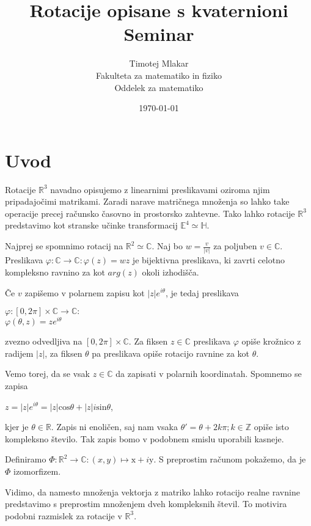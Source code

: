 \documentclass[a4paper,12pt]{article}
\title{Rotacije opisane s kvaternioni \\ 
\Large Seminar}
\author{Timotej Mlakar \\
Fakulteta za matematiko in fiziko \\
Oddelek za matematiko}
\date{\today}
\def\Z{\mathbb{Z}} %
\def\R{\mathbb{R}} %
\def\C{\mathbb{C}} %
\def\H{\mathbb{H}} %
\def\E{\mathbb{E}} %
\begin{document}


\maketitle



\section{Uvod}

Rotacije $\R^3$ navadno opisujemo z linearnimi preslikavami oziroma njim pripadajočimi matrikami.
Zaradi narave matričnega množenja so lahko take operacije precej računsko časovno in prostorsko zahtevne. Tako lahko rotacije
$\R^3$ predstavimo kot stranske učinke transformacij $\E^4 \simeq \H$.


Najprej se spomnimo rotacij na $\R^2 \simeq \C$. Naj bo $w = \frac{v}{|v|}$ za poljuben $v \in \C$.
Preslikava $\varphi : \C \rightarrow \C : \varphi (z) = wz$ je bijektivna preslikava, ki zavrti celotno kompleksno ravnino za
kot $arg(z)$ okoli izhodišča.


Če $v$ zapišemo v polarnem zapisu kot $|z| e^{i \theta}$, je tedaj preslikava 
\begin{center}
   $\varphi : \left[ 0, 2\pi\right] \times \C \rightarrow \C :$\\
   \vspace*{1ex}
   $\varphi(\theta, z) = z e^{i\theta}$
\end{center}
zvezno odvedljiva na $\left[0, 2\pi\right] \times \C$. Za fiksen $z \in \C$ preslikava $\varphi$ opiše krožnico z radijem $|z|$,
za fiksen $\theta$ pa preslikava opiše rotacijo ravnine za kot $\theta$.

Vemo torej, da se vsak $z \in \C$ da zapisati v polarnih koordinatah. Spomnemo se zapisa
\begin{center}
   $z = |z|e^{i\theta} = |z|\text{cos}\theta + |z|i\text{sin}\theta$,
\end{center}
kjer je $\theta \in \R$. Zapis ni enoličen, saj nam vsaka $\theta' = \theta + 2k\pi; k \in \Z$ opiše isto kompleksno število.
Tak zapis bomo v podobnem smislu uporabili kasneje.

Definiramo $\varPhi : \R^2 \rightarrow \C : (x,y) \mapsto \text{x} + i\text{y}$. S preprostim računom pokažemo, da je $\varPhi$ izomorfizem.

Vidimo, da namesto množenja vektorja z matriko lahko rotacijo realne ravnine predstavimo s preprostim množenjem dveh kompleksnih števil.
To motivira podobni razmislek za rotacije v $\R^3$.
\end{document}
